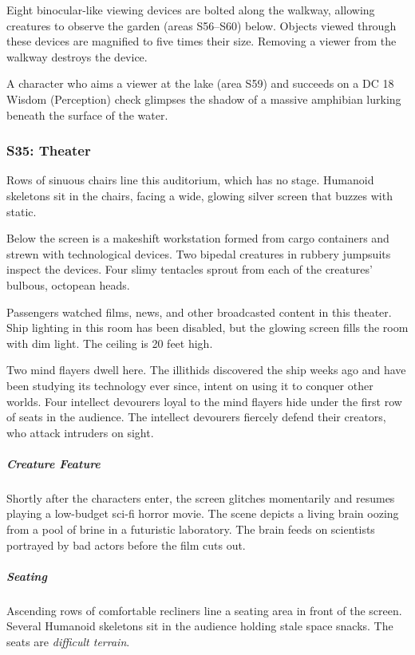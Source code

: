 \documentclass[10pt,a4paper,twoside,bg=print,twocolumn,openany,nodeprecatedcode]{dndbook}
\begin{document}
Eight binocular-like viewing devices are bolted along the walkway, allowing creatures to observe the garden (areas S56–S60) below. Objects viewed through these devices are magnified to five times their size. Removing a viewer from the walkway destroys the device.

A character who aims a viewer at the lake (area S59) and succeeds on a DC 18 Wisdom (Perception) check glimpses the shadow of a massive amphibian lurking beneath the surface of the water.

\subsubsection{S35: Theater}
\begin{DndReadAloud}{}
Rows of sinuous chairs line this auditorium, which has no stage. Humanoid skeletons sit in the chairs, facing a wide, glowing silver screen that buzzes with static.

Below the screen is a makeshift workstation formed from cargo containers and strewn with technological devices. Two bipedal creatures in rubbery jumpsuits inspect the devices. Four slimy tentacles sprout from each of the creatures' bulbous, octopean heads.

\end{DndReadAloud}

Passengers watched films, news, and other broadcasted content in this theater. Ship lighting in this room has been disabled, but the glowing screen fills the room with dim light. The ceiling is 20 feet high.

Two mind flayers dwell here. The illithids discovered the ship weeks ago and have been studying its technology ever since, intent on using it to conquer other worlds. Four intellect devourers loyal to the mind flayers hide under the first row of seats in the audience. The intellect devourers fiercely defend their creators, who attack intruders on sight.

\subparagraph{Creature Feature}
Shortly after the characters enter, the screen glitches momentarily and resumes playing a low-budget sci-fi horror movie. The scene depicts a living brain oozing from a pool of brine in a futuristic laboratory. The brain feeds on scientists portrayed by bad actors before the film cuts out.

\subparagraph{Seating}
Ascending rows of comfortable recliners line a seating area in front of the screen. Several Humanoid skeletons sit in the audience holding stale space snacks. The seats are \textit{difficult terrain}.
\end{document}
